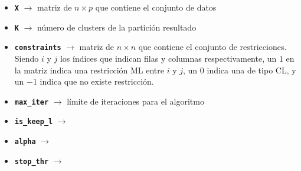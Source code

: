 \begin{itemize}
	
	\item \textbf{\texttt{X}} {$\longrightarrow$ matriz de $n \times p$ que contiene el conjunto de datos}
	
	\item \textbf{\texttt{K}} {$\longrightarrow$ número de clusters de la partición resultado}
	
	\item \textbf{\texttt{constraints}} {$\longrightarrow$ matriz de $n \times n$ que contiene el conjunto de restricciones. Siendo $i$ y $j$ los índices que indican filas y columnas respectivamente, un $1$ en la matriz indica una restricción \acs{ML} entre $i$ y $j$, un $0$ indica una de tipo \acs{CL}, y un $-1$ indica que no existe restricción.}
	
	\item \textbf{\texttt{max\_iter}} {$\longrightarrow$ límite de iteraciones para el algoritmo}
	
	\item \textbf{\texttt{is\_keep\_l}} {$\longrightarrow$}
	
	\item \textbf{\texttt{alpha}} {$\longrightarrow$}
	
	\item \textbf{\texttt{stop\_thr}} {$\longrightarrow$}
	
\end{itemize}








